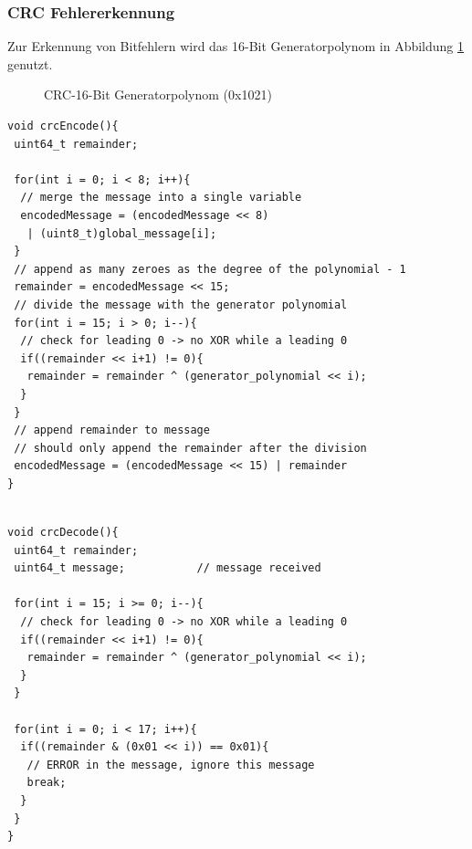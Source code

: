\subsubsection{CRC Fehlererkennung}
Zur Erkennung von Bitfehlern wird das 16-Bit Generatorpolynom in Abbildung \ref{CRC-Polynom} genutzt. 
\begin{figure}[H]
	\centering    
	\caption{CRC-16-Bit Generatorpolynom (0x1021)}
	\label{CRC-Polynom}
\end{figure}


\begin{lstlisting}[caption={CRC-Encoder Funktion. Noch nicht implementiert, dies ist lediglich ein Ansatz der noch im Programm einzubinden ist.}, label={lst:crcEncode}]
void crcEncode(){
 uint64_t remainder;
		
 for(int i = 0; i < 8; i++){
  // merge the message into a single variable
  encodedMessage = (encodedMessage << 8) 
   | (uint8_t)global_message[i]; 
 }
 // append as many zeroes as the degree of the polynomial - 1
 remainder = encodedMessage << 15; 
 // divide the message with the generator polynomial
 for(int i = 15; i > 0; i--){
  // check for leading 0 -> no XOR while a leading 0
  if((remainder << i+1) != 0){
   remainder = remainder ^ (generator_polynomial << i);
  }
 }
 // append remainder to message
 // should only append the remainder after the division
 encodedMessage = (encodedMessage << 15) | remainder   
}
	
\end{lstlisting}

\begin{lstlisting}[caption={CRC-Decoder Funktion. Noch nicht implementiert, dies ist lediglich ein Ansatz der noch im Programm einzubinden ist.}, label={lst:crcDencode}]
void crcDecode(){
 uint64_t remainder;
 uint64_t message;           // message received
	
 for(int i = 15; i >= 0; i--){
  // check for leading 0 -> no XOR while a leading 0
  if((remainder << i+1) != 0){
   remainder = remainder ^ (generator_polynomial << i);
  }
 }
		
 for(int i = 0; i < 17; i++){
  if((remainder & (0x01 << i)) == 0x01){
   // ERROR in the message, ignore this message
   break;
  } 
 }
}
	
\end{lstlisting}


